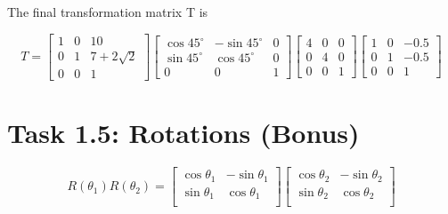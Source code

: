 \documentclass[paper=a4, fontsize=11pt]{scrartcl} %
\numberwithin{equation}{section} %
\numberwithin{figure}{section} %
\numberwithin{table}{section} %
\begin{document}
The final transformation matrix T is

\[
  T=
  \begin{bmatrix}
    1 & 0 & 10\\
    0 & 1 & 7 + 2\sqrt{2}\\
    0 & 0 & 1
  \end{bmatrix}
  \begin{bmatrix}
    \cos{45^\circ} & -\sin{45^\circ} & 0\\
    \sin{45^\circ} & \cos{45^\circ} & 0\\
    0 & 0 & 1
  \end{bmatrix}
  \begin{bmatrix}
    4 & 0 & 0\\
    0 & 4 & 0\\
    0 & 0 & 1
  \end{bmatrix}
  \begin{bmatrix}
    1 & 0 & -0.5\\
    0 & 1 & -0.5\\
    0 & 0 & 1
  \end{bmatrix}
\]

\section*{Task 1.5: Rotations (Bonus)}

\[
  R(\theta_1)R(\theta_2) =
  \begin{bmatrix}
    \cos{\theta_1} & -\sin{\theta_1}\\
    \sin{\theta_1} & \cos{\theta_1}\\
  \end{bmatrix}
  \begin{bmatrix}
    \cos{\theta_2} & -\sin{\theta_2}\\
    \sin{\theta_2} & \cos{\theta_2}\\
  \end{bmatrix}
\]
\end{document}
